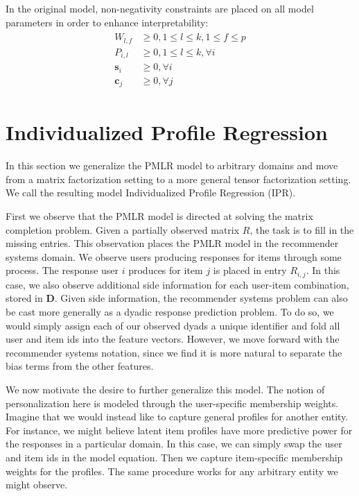 \documentclass[10pt]{proc}
\begin{document}
In the original model, non-negativity constraints are placed on all model
parameters in order to enhance interpretability:
%
\begin{align}
  \begin{split}
    W_{l,f}  &\ge 0, 1 \le l \le k, 1 \le f \le p  \\
    P_{i,l}  &\ge 0, 1 \le l \le k, \forall i      \\
    \bm{s}_i &\ge 0, \forall i                     \\
    \bm{c}_j &\ge 0, \forall j
  \end{split}
\end{align}


\section{Individualized Profile Regression}

In this section we generalize the PMLR model to arbitrary domains and move from
a matrix factorization setting to a more general tensor factorization setting.
We call the resulting model Individualized Profile Regression (IPR).

First we observe that the PMLR model is directed at solving the matrix
completion problem. Given a partially observed matrix $R$, the task is to fill
in the missing entries. This observation places the PMLR model in the
recommender systems domain. We observe users producing responses for items
through some process. The response user $i$ produces for item $j$ is placed in
entry $R_{i,j}$. In this case, we also observe additional side information for
each user-item combination, stored in $\bm{D}$. Given side information, the
recommender systems problem can also be cast more generally as a dyadic response
prediction problem. To do so, we would simply assign each of our observed dyads
a unique identifier and fold all user and item ids into the feature vectors.
However, we move forward with the recommender systems notation, since we find it
is more natural to separate the bias terms from the other features.

We now motivate the desire to further generalize this model. The notion of
personalization here is modeled through the user-specific membership weights.
Imagine that we would instead like to capture general profiles for another
entity. For instance, we might believe latent item profiles have more predictive
power for the responses in a particular domain. In this case, we can simply swap
the user and item ids in the model equation. Then we capture item-specific
membership weights for the profiles. The same procedure works for any arbitrary
entity we might observe.
\end{document}
